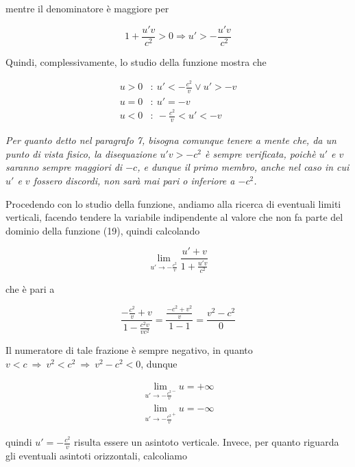 \documentclass{article}
\begin{document}
mentre il denominatore è maggiore per

\begin{equation}
    1 + \frac{u'v}{c^2} > 0 \Rightarrow u' > - \frac{u'v}{c^2}
\end{equation}

Quindi, complessivamente, lo studio della funzione mostra che

\begin{align*}
    u > 0 &:\ u' < - \frac{c^2}{v} \vee u' > -v  \\
    u = 0 &:\ u' = -v \\
    u < 0 &:\ - \frac{c^2}{v} < u' < -v
\end{align*}

\textit{Per quanto detto nel paragrafo 7, bisogna comunque
tenere a mente che, da un punto di vista fisico, la disequazione
\(u'v > -c^2\) è sempre verificata, poichè \(u'\) e \(v\)
saranno sempre maggiori di \(-c\), e dunque il primo membro, anche
nel caso in cui \(u'\) e \(v\) fossero discordi, non
sarà mai pari o inferiore a \(-c^2\).}\hfill\break

Procedendo con lo studio della funzione, andiamo alla ricerca
di eventuali limiti verticali, facendo tendere la variabile
indipendente al valore che non fa parte del dominio della
funzione (19), quindi calcolando

\begin{equation}
    \lim_{u' \rightarrow - \frac{c^2}{v}}{\frac{u' + v}{1 + \frac{u'v}{c^2}}}
\end{equation}

che è pari a

\begin{equation}
    \frac{- \frac{c^2}{v} + v}{1 - \frac{c^2v}{vc^2}} = \frac{\frac{-c^2 + v^2}{v}}{1 - 1} = \frac{v^2 - c^2}{0}
\end{equation}

Il numeratore di tale frazione è sempre negativo,
in quanto \(v < c\ \Rightarrow\ v^2 < c^2\ \Rightarrow\ v^2 - c^2 < 0\),
dunque

\begin{align*}
    \lim_{u' \rightarrow - \frac{c^2}{v}^-}{u} = + \infty \\
    \lim_{u' \rightarrow - \frac{c^2}{v}^+}{u} = - \infty
\end{align*}

quindi \(u' = - \frac{c^2}{v}\) risulta essere un asintoto verticale. Invece,
per quanto riguarda gli eventuali asintoti orizzontali, calcoliamo
\end{document}
